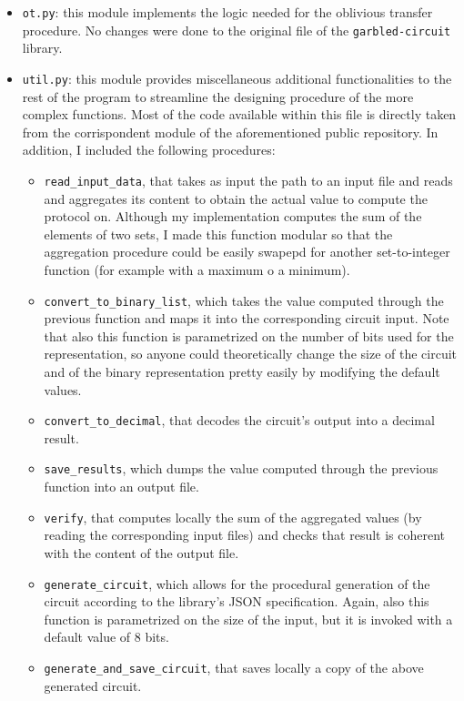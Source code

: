 \documentclass[12pt]{article}
\begin{document}
\begin{itemize}
  \item \texttt{ot.py}: this module implements the logic needed for the oblivious transfer procedure. No changes were done to the original file of the \texttt{garbled-circuit} library.
  \item \texttt{util.py}: this module provides miscellaneous additional functionalities to the rest of the program to streamline the designing procedure of the more complex functions. Most of the code available within this file is directly taken from the corrispondent module of the aforementioned public repository. In addition, I included the following procedures:
  \begin{itemize}
    \item \texttt{read\_input\_data}, that takes as input the path to an input file and reads and aggregates its content to obtain the actual value to compute the protocol on. Although my implementation computes the sum of the elements of two sets, I made this function modular so that the aggregation procedure could be easily swapepd for another set-to-integer function (for example with a maximum o a minimum).
    \item \texttt{convert\_to\_binary\_list}, which takes the value computed through the previous function and maps it into the corresponding circuit input. Note that also this function is parametrized on the number of bits used for the representation, so anyone could theoretically change the size of the circuit and of the binary representation pretty easily by modifying the default values.
    \item \texttt{convert\_to\_decimal}, that decodes the circuit's output into a decimal result.
    \item \texttt{save\_results}, which dumps the value computed through the previous function into an output file.
    \item \texttt{verify}, that computes locally the sum of the aggregated values (by reading the corresponding input files) and checks that result is coherent with the content of the output file.
    \item \texttt{generate\_circuit}, which allows for the procedural generation of the circuit according to the library's JSON specification. Again, also this function is parametrized on the size of the input, but it is invoked with a default value of 8 bits.
    \item \texttt{generate\_and\_save\_circuit}, that saves locally a copy of the above generated circuit.
  \end{itemize} 
\end{itemize}
\end{document}
